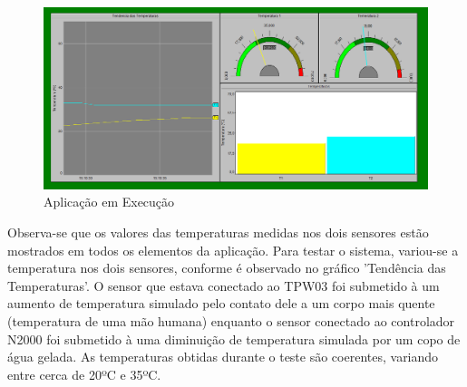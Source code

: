 \begin{figure}[ht!]
\centering
\includegraphics[scale=0.40]{InterfaceRun.png}
\caption{Aplicação em Execução}
\label{fig:InterfaceRun}
\end{figure}


Observa-se que os valores das temperaturas medidas nos dois sensores estão mostrados em todos os elementos da aplicação. Para testar o sistema, variou-se a temperatura nos dois sensores, conforme é observado no gráfico 'Tendência das Temperaturas'. O sensor que estava conectado ao TPW03 foi submetido à um aumento de temperatura simulado pelo contato dele a um corpo mais quente (temperatura de uma mão humana) enquanto o sensor conectado ao controlador N2000 foi submetido à uma diminuição de temperatura simulada por um copo de água gelada. As temperaturas obtidas durante o teste são coerentes, variando entre cerca de 20ºC e 35ºC.









